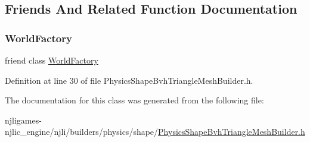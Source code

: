 \subsection{Friends And Related Function Documentation}
\mbox{\label{classnjli_1_1_physics_shape_bvh_triangle_mesh_builder_acb96ebb09abe8f2a37a915a842babfac}} 
\subsubsection{\texorpdfstring{World\+Factory}{WorldFactory}}
{\footnotesize\ttfamily friend class \mbox{\hyperlink{classnjli_1_1_world_factory}{World\+Factory}}\hspace{0.3cm}{\ttfamily [friend]}}



Definition at line 30 of file Physics\+Shape\+Bvh\+Triangle\+Mesh\+Builder.\+h.



The documentation for this class was generated from the following file\+:\begin{DoxyCompactItemize}
\item 
njligames-\/njlic\+\_\+engine/njli/builders/physics/shape/\mbox{\hyperlink{_physics_shape_bvh_triangle_mesh_builder_8h}{Physics\+Shape\+Bvh\+Triangle\+Mesh\+Builder.\+h}}\end{DoxyCompactItemize}
